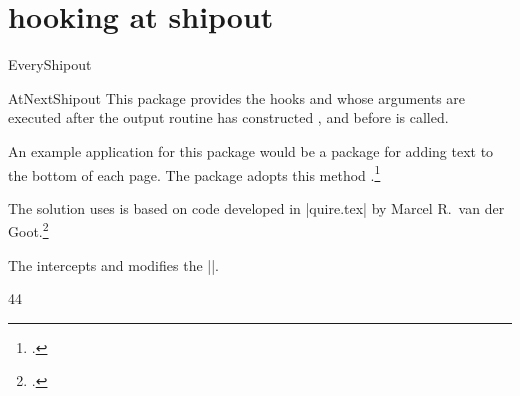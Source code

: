 \section{hooking at shipout}

\begin{docCmd} {EveryShipout} {}
\begin{docCmd} {AtNextShipout} {}
This package provides the hooks  and 
   whose arguments are executed after the output 
  routine has constructed , and before  is 
  called.
\end{docCmd}
\end{docCmd}

An example application for this package would be a package for
 adding text to the bottom of each page.
 The   package adopts this method \citep{prelim2e}.\footcite{prelim2e}

The solution  uses is based on code developed in  |quire.tex| by
 Marcel R.~van der Goot.\footcite{quire}  

The   intercepts and modifies the ||. 

\begin{teX}
44 \newcommand{\@Prelim@EveryShipout}{%
45 \bgroup
46 \dimen\z@=\wd\@cclv
47 \dimen\@ne=\ht\@cclv
48 \dimen\tw@=\dp\@cclv
49 \dimen\thr@@=\dimen1
50 \advance\dimen\thr@@ by \dimen\tw@
51 \global\setbox\@cclv\vbox to \dimen\thr@@{%
52 \hb@xt@\dimen\z@{%
53 \box\@cclv%
54 \hss
55 }%
\end{teX}
To this we append the text produced by |\PrelimText|. It is put in a |\vbox to 0pt|
in which a |\hbox| to the width of |\box255| is included, in which |\PrelimText| is set.
We have to reset |\protect| because it is set to |\noexpand| by the output routine.

\begin{teX}
56 \vbox to \z@{%
57 \hb@xt@\dimen\z@{%
58 \let\protect\relax
59 \hfill\PrelimText\hfill
60 }%
61 \vss
62 }%
63 \vss
64 }%
\end{teX}

Finally we set the dimensions of |\box255| to the values they had before |\@Prelim@EveryShipout|.

\begin{teX}
65 \wd\@cclv=\dimen\z@
66 \ht\@cclv=\dimen\@ne
67 \dp\@cclv=\dimen\tw@
68 \egroup
69}
\end{teX}

